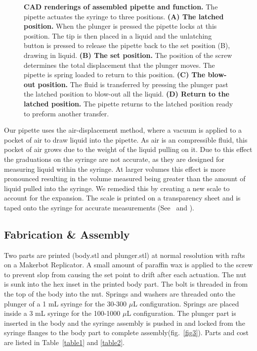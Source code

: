 \documentclass[10pt,letterpaper]{article}
\begin{document}
\begin{figure}
	\caption{
		{\bf CAD renderings of assembled pipette and function.} The pipette actuates the syringe to three positions. {\bf (A) The latched position.} When the plunger is pressed the pipette locks at this position. The tip is then placed in a liquid and the unlatching button is pressed to release the pipette back to the set position (B), drawing in liquid.  {\bf(B) The set position.} The position of the screw determines the total displacement that the plunger moves. The pipette is spring loaded to return to this position. {\bf (C) The blow-out position.} The fluid is transferred by pressing the plunger past the latched position to blow-out all the liquid. {\bf (D) Return to the latched position.} The pipette returns to the latched position ready to preform another transfer.
	}
	\label{fig2}
\end{figure}

Our pipette uses the air-displacement method, where a vacuum is applied to a pocket of air to draw liquid into the pipette.
As air is an compressible fluid, this pocket of air grows due to the weight of the liquid pulling on it.
Due to this effect the graduations on the syringe are not accurate, as they are designed for measuring liquid within the syringe.
At larger volumes this effect is more pronounced resulting in the volume measured being greater than the amount of liquid pulled into the syringe.
We remedied this by creating a new scale to account for the expansion.
The scale is printed on a transparency sheet and is taped onto the syringe for accurate measurements (See~ and ).

\subsection*{Fabrication \& Assembly}
Two parts are printed (body.stl and plunger.stl) at normal resolution with rafts on a Makerbot Replicator.
A small amount of paraffin wax is applied to the screw to prevent slop from causing the set point to drift after each actuation.
The nut is sunk into the hex inset in the printed body part.
The bolt is threaded in from the top of the body into the nut.
Springs and washers are threaded onto the plunger of a 1 mL syringe for the 30-300 $\mu$L configuration.
Springs are placed inside a 3 mL syringe for the 100-1000 $\mu$L configuration.
The plunger part is inserted in the body and the syringe assembly is pushed in and locked from the syringe flanges to the body part to complete assembly(fig.~\ref{fig3}).
Parts and cost are listed in Table~\ref{table1} and \ref{table2}.
\end{document}
